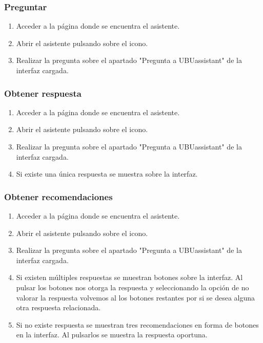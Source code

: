 \subsubsection{Preguntar}

\begin{enumerate}
\item Acceder a la página donde se encuentra el asistente.
\item Abrir el asistente pulsando sobre el icono.
\item Realizar la pregunta sobre el apartado "Pregunta a UBUassistant" de la interfaz cargada.
\end{enumerate}

\subsubsection{Obtener respuesta}

\begin{enumerate}
\item Acceder a la página donde se encuentra el asistente.
\item Abrir el asistente pulsando sobre el icono.
\item Realizar la pregunta sobre el apartado "Pregunta a UBUassistant" de la interfaz cargada.
\item Si existe una única respuesta se muestra sobre la interfaz.
\end{enumerate}

\subsubsection{Obtener recomendaciones}

\begin{enumerate}
\item Acceder a la página donde se encuentra el asistente.
\item Abrir el asistente pulsando sobre el icono.
\item Realizar la pregunta sobre el apartado "Pregunta a UBUassistant" de la interfaz cargada.
\item Si existen múltiples respuestas se muestran botones sobre la interfaz.
Al pulsar los botones nos otorga la respuesta y seleccionando la opción de no valorar la respuesta volvemos al los botones restantes por si se desea alguna otra respuesta relacionada.

\item Si no existe respuesta se muestran tres recomendaciones en forma de botones en la interfaz.
Al pulsarlos se muestra la respuesta oportuna.

\end{enumerate}

